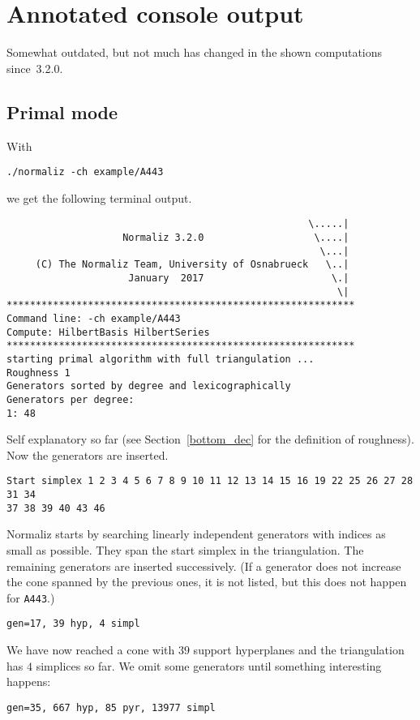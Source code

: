 \section{Annotated console output}\label{Console}

Somewhat outdated, but not much has changed in the shown computations since~3.2.0.

\subsection{Primal mode}

With
\begin{Verbatim}
./normaliz -ch example/A443
\end{Verbatim}
we get the following terminal output.

\begin{Verbatim}
                                                    \.....|
                    Normaliz 3.2.0                   \....|
                                                      \...|
     (C) The Normaliz Team, University of Osnabrueck   \..|
                     January  2017                      \.|
                                                         \|
************************************************************
Command line: -ch example/A443 
Compute: HilbertBasis HilbertSeries 
************************************************************
starting primal algorithm with full triangulation ...
Roughness 1
Generators sorted by degree and lexicographically
Generators per degree:
1: 48 
\end{Verbatim}
Self explanatory so far (see Section~\ref{bottom_dec} for the definition of roughness). Now the generators are inserted.
\begin{Verbatim}
Start simplex 1 2 3 4 5 6 7 8 9 10 11 12 13 14 15 16 19 22 25 26 27 28 31 34 
37 38 39 40 43 46 
\end{Verbatim}
Normaliz starts by searching linearly independent generators with indices as small as possible. They span the start simplex in the triangulation. The remaining generators are inserted successively. (If a generator does not increase the cone spanned by the previous ones, it is not listed, but this does not happen for \verb|A443|.)
\begin{Verbatim}
gen=17, 39 hyp, 4 simpl
\end{Verbatim}
We have now reached a cone with $39$ support hyperplanes and the triangulation has $4$ simplices so far. We omit some generators until something interesting happens:
\begin{Verbatim}
gen=35, 667 hyp, 85 pyr, 13977 simpl
\end{Verbatim}
